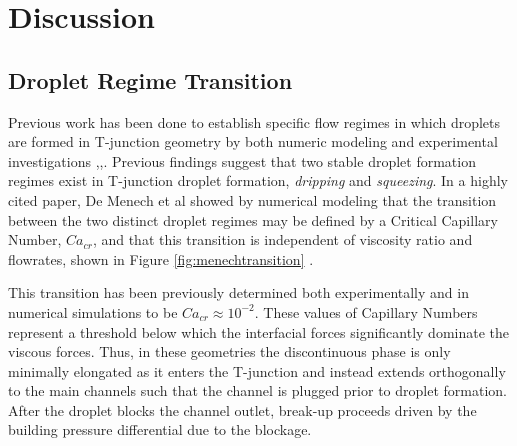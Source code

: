 \clearpage


\section{Discussion}
\subsection{Droplet Regime Transition}

Previous work has been done to establish specific flow regimes in which droplets are formed in T-junction geometry by both numeric modeling and experimental investigations \cite{Abate2012a},\cite{DeMenech2008},\cite{Garstecki2006}. Previous findings suggest that two stable droplet formation regimes exist in T-junction droplet formation, \emph{dripping} and \emph{squeezing}. In a highly cited paper, De Menech et al showed by numerical modeling that the transition between the two distinct droplet regimes may be defined by a Critical Capillary Number, $Ca_{cr}$, and that this transition is independent of viscosity ratio and flowrates, shown in Figure \vref{fig:menechtransition} \cite{DeMenech2008}. 

This transition has been previously determined both experimentally and in numerical simulations to be $Ca_{cr}\approx 10^{-2}$. These values of Capillary Numbers represent a threshold below which the interfacial forces significantly dominate the viscous forces. Thus, in these geometries the discontinuous phase is only minimally elongated as it enters the T-junction and instead extends orthogonally to the main channels such that the channel is plugged prior to droplet formation. After the droplet blocks the channel outlet, break-up proceeds driven by the building pressure differential due to the blockage.

